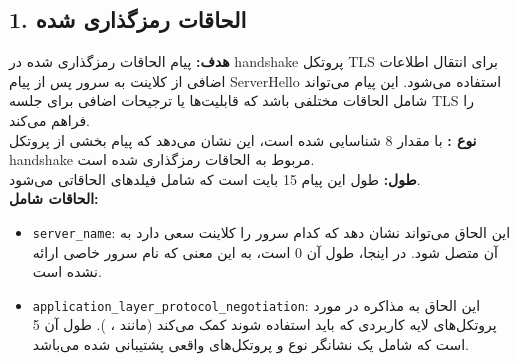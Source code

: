 \subsection*{1. الحاقات رمزگذاری شده}
\textbf{هدف:} پیام الحاقات رمزگذاری شده در handshake پروتکل TLS برای انتقال اطلاعات اضافی از کلاینت به سرور پس از پیام ServerHello استفاده می‌شود. این پیام می‌تواند شامل الحاقات مختلفی باشد که قابلیت‌ها یا ترجیحات اضافی برای جلسه TLS را فراهم می‌کند.\\
\textbf{نوع :} با مقدار 8 شناسایی شده است، این نشان می‌دهد که پیام بخشی از پروتکل handshake مربوط به الحاقات رمزگذاری شده است.\\
\textbf{طول:} طول این پیام 15 بایت است که شامل فیلدهای الحاقاتی می‌شود.\\
\textbf{الحاقات شامل:}
\begin{itemize}
    \item \texttt{server\_name}: این الحاق می‌تواند نشان دهد که کدام سرور را کلاینت سعی دارد به آن متصل شود. در اینجا، طول آن 0 است، به این معنی که نام سرور خاصی ارائه نشده است.
    \item \texttt{application\_layer\_protocol\_negotiation}: این الحاق به مذاکره در مورد پروتکل‌های لایه کاربردی که باید استفاده شوند کمک می‌کند (مانند ، ). طول آن 5 است که شامل یک نشانگر نوع و پروتکل‌های واقعی پشتیبانی شده می‌باشد.
\end{itemize}

